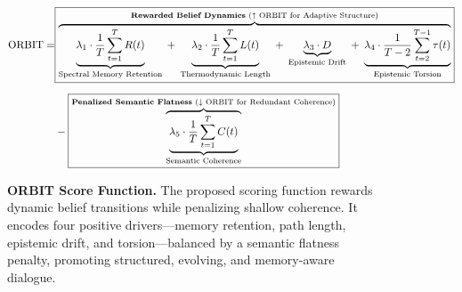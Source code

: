 \documentclass[11pt]{article}
\begin{document}
\vspace{-3mm}
\begin{center}
\begin{figure}[t!]
\small
\centering
\begin{tcolorbox}[
  enhanced,
  colback=white,
  colframe=black,
  boxrule=1pt,
  borderline={0.6pt}{2pt}{black},
  sharp corners,
  width=\textwidth,
]
\vspace{-2mm}
\[
\begin{aligned}
\text{ORBIT} =  
&\boxed{
\overbrace{
\underbrace{\lambda_1 \cdot \frac{1}{T} \sum_{t=1}^{T} R(t)}_{\text{Spectral Memory Retention}} \; + \;
\underbrace{\lambda_2 \cdot \frac{1}{T} \sum_{t=1}^{T} L(t)}_{\text{Thermodynamic Length}} \; + \;
\underbrace{\lambda_3 \cdot D}_{\text{Epistemic Drift}} \; + \;
\underbrace{\lambda_4 \cdot \frac{1}{T-2} \sum_{t=2}^{T-1} \tau(t)}_{\text{Epistemic Torsion}}
}^{\text{\textbf{Rewarded Belief Dynamics} (↑ ORBIT for Adaptive Structure)}}
} \\[1.5ex]
& - \boxed{
\overbrace{
\underbrace{ \lambda_5 \cdot \frac{1}{T} \sum_{t=1}^{T} C(t) }_{\text{Semantic Coherence}}
}^{\text{\textbf{Penalized Semantic Flatness} (↓ ORBIT for Redundant Coherence)}}
}
\end{aligned}
\]
\vspace{-5mm}
\end{tcolorbox}

\vspace{-2mm}
\caption{
    \textbf{ORBIT Score Function.} The proposed scoring function rewards dynamic belief transitions while penalizing shallow coherence. It encodes four positive drivers—memory retention, path length, epistemic drift, and torsion—balanced by a semantic flatness penalty, promoting structured, evolving, and memory-aware dialogue.
}
\label{fig:orbit_equation}
\end{figure}

\vspace{1mm}

\begin{table}[t!]
\centering
\scriptsize
\renewcommand{\arraystretch}{1.45}
\end{table}
\end{center}
\end{document}
